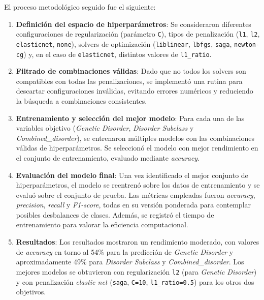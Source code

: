 \documentclass[11pt,a4paper,spanish]{book}
\numberwithin{equation}{chapter}
\numberwithin{figure}{chapter}
\begin{document}
El proceso metodológico seguido fue el siguiente:

\begin{enumerate}
    \item \textbf{Definición del espacio de hiperparámetros}: 
    Se consideraron diferentes configuraciones de regularización (parámetro \texttt{C}), 
    tipos de penalización (\texttt{l1}, \texttt{l2}, \texttt{elasticnet}, \texttt{none}), 
    solvers de optimización (\texttt{liblinear}, \texttt{lbfgs}, \texttt{saga}, \texttt{newton-cg}) 
    y, en el caso de \texttt{elasticnet}, distintos valores de \texttt{l1\_ratio}.
    
    \item \textbf{Filtrado de combinaciones válidas}: 
    Dado que no todos los solvers son compatibles con todas las penalizaciones, 
    se implementó una rutina para descartar configuraciones inválidas, evitando errores 
    numéricos y reduciendo la búsqueda a combinaciones consistentes.
    
    \item \textbf{Entrenamiento y selección del mejor modelo}: 
    Para cada una de las variables objetivo 
    (\textit{Genetic Disorder}, \textit{Disorder Subclass} y \textit{Combined\_disorder}), 
    se entrenaron múltiples modelos con las combinaciones válidas de hiperparámetros. 
    Se seleccionó el modelo con mejor rendimiento en el conjunto de entrenamiento, 
    evaluado mediante \textit{accuracy}.
    
    \item \textbf{Evaluación del modelo final}: 
    Una vez identificado el mejor conjunto de hiperparámetros, 
    el modelo se reentrenó sobre los datos de entrenamiento y se evaluó sobre el conjunto de prueba. 
    Las métricas empleadas fueron \textit{accuracy}, \textit{precision}, \textit{recall} y 
    \textit{F1-score}, todas en su versión ponderada para contemplar posibles desbalances de clases. 
    Además, se registró el tiempo de entrenamiento para valorar la eficiencia computacional.
    
    \item \textbf{Resultados}: 
    Los resultados mostraron un rendimiento moderado, con valores de \textit{accuracy} en torno al 
    54\% para la predicción de \textit{Genetic Disorder} y aproximadamente 49\% para 
    \textit{Disorder Subclass} y \textit{Combined\_disorder}. 
    Los mejores modelos se obtuvieron con regularización \texttt{l2} (para \textit{Genetic Disorder}) 
    y con penalización \textit{elastic net} (\texttt{saga}, \texttt{C=10}, \texttt{l1\_ratio=0.5}) 
    para los otros dos objetivos.
\end{enumerate}
\end{document}
